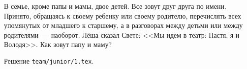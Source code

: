 \problem{}
В семье, кроме папы и мамы, двое детей.
Все зовут друг друга по имени.
Принято, обращаясь к своему ребенку или своему родителю, перечислять всех
упомянутых от младшего к старшему,
а в разговорах между детьми или между родителями~--- наоборот.
Лёша сказал Свете: <<Мы идем в театр: Настя, я и Володя>>.
Как зовут папу и маму?

\solution Решение \texttt{team/junior/1.tex}.
\endproblem
